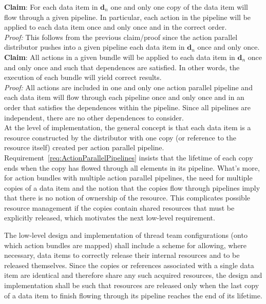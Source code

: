 \documentclass{article}
\begin{document}
\textbf{Claim}: For each data item in $\mathbf{d}_n$ one and only one copy of the data
item will flow through a given pipeline.  In particular, each action in the
pipeline will be applied to each data item once and only once and in the correct
order.\\[0.05in]
\textit{Proof:}\hspace{0.125in} This follows from the previous
claim/proof since the action parallel distributor pushes into a given pipeline
each data item in $\mathbf{d}_n$ once and only once.\\

\textbf{Claim}: All actions in a given bundle will be applied to each data item in
$\mathbf{d}_n$ once and only once and such that dependences are satisfied.  In
other words, the execution of each bundle will yield correct results.\\[0.05in]
\textit{Proof:}\hspace{0.125in}  All actions are included in one and only one
action parallel pipeline and each data item will flow through each pipeline once
and only once and in an order that satisfies the dependences within the
pipeline.  Since all pipelines are independent, there are no other dependences
to consider.\\

At the level of implementation, the general concept is that each data item is a
resource constructed by the distributor with one copy (or reference to the
resource itself) created per action parallel pipeline.
Requirement~\ref{req:ActionParallelPipelines} insists that the lifetime of each
copy ends when the copy has flowed through all elements in its pipeline.  What's
more, for action bundles with multiple action parallel pipelines, the need for
multiple copies of a data item and the notion that the copies flow through
pipelines imply that there is no notion of ownership of the resource.  This
complicates possible resource management if the copies contain shared resources
that must be explicitly released, which motivates the next low-level
requirement.

\begin{req}
The low-level design and implementation of thread team configurations (onto
which action bundles are mapped) shall include a scheme for allowing, where
necessary, data items to correctly release their internal resources and to be
released themselves.  Since the copies or references associated with a single
data item are identical and therefore share any such acquired resources, the
design and implementation shall be such that resources are released only when
the last copy of a data item to finish flowing through its pipeline reaches the
end of its lifetime.
\end{req}
\end{document}
